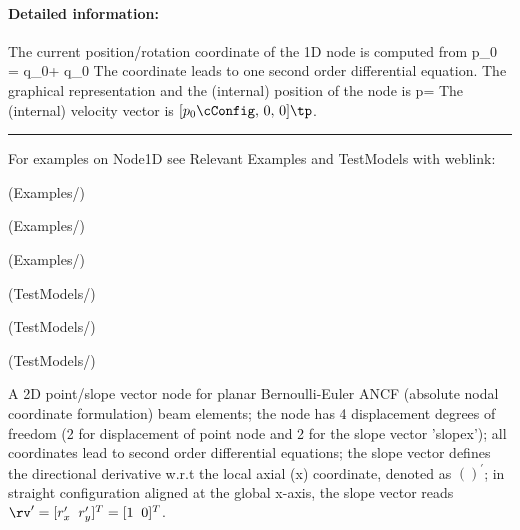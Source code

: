     \paragraph{Detailed information:}
    The current position/rotation coordinate of the 1D node is computed from
    \be
      p_0 = {q_0}\cRef + {q_0}\cCur
    \ee
    The coordinate leads to one second order differential equation.
    The graphical representation and the (internal) position of the node is
    \be
      p\cConfig= 
    \ee
    The (internal) velocity vector is $[{p_0}\cConfig,\,0,\,0]\tp$.
\vspace{6pt}\par\noindent\rule{\textwidth}{0.4pt}
%
\noindent For examples on Node1D see Relevant Examples and TestModels with weblink:
\bi
\item {} (Examples/)
\item {} (Examples/)
\item {} (Examples/)
\item {} (TestModels/)
\item {} (TestModels/)
\item {} (TestModels/)

\ei

%
\newpage


\label{sec:item:NodePoint2DSlope1}
A 2D point/slope vector node for planar Bernoulli-Euler ANCF (absolute nodal coordinate formulation) beam elements; the node has 4 displacement degrees of freedom (2 for displacement of point node and 2 for the slope vector 'slopex'); all coordinates lead to second order differential equations; the slope vector defines the directional derivative w.r.t the local axial (x) coordinate, denoted as $()^\prime$; in straight configuration aligned at the global x-axis, the slope vector reads $\rv^\prime=[r_x^\prime\;\;r_y^\prime]^T=[1\;\;0]^T$.
\vspace{12pt}\\

